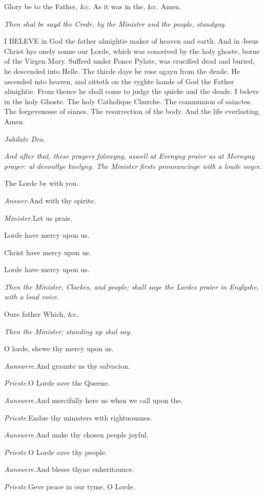 Glory be to the Father, \&c. As it was in the, \&c.
Amen.

\emph{Then
shal be sayd the Crede, by the Minister and the people, standyng.}

I
BELEVE in God the father almightie maker of heaven and earth. And in Jesus
Christ hys onely sonne our Lorde, which was conceived by the holy ghoste,
borne of the Virgen Mary. Suffred under Ponce Pylate, was crucified dead
and buried, he descended into Helle. The thirde daye he rose agayn from
the deade. He ascended into heaven, and sitteth on the ryghte hande of
God the Father almightie. From thence he shall come to judge the quicke
and the deade. I beleve in the holy Ghoste. The holy Catholique Churche.
The communion of sainctes. The forgevenesse of sinnes. The resurrection
of the body. And the life everlasting. Amen.

\emph{Jubilate
Deo.}

\emph{And after that, these prayers folowyng, aswell at Evenyng praier as at
Mornyng prayer: al devoutlye knelyng. The Minister firste pronouncinge
with a loude voyce.}

The Lorde be with you.

\emph{Answer.}And with thy
spirite.

\emph{Minister.}Let us praie.

Lorde have mercy upon us.

Christ have mercy upon us.

Lorde have mercy upon us.

\emph{Then
the Minister, Clarkes, and people; shall saye the Lordes praier in Englyshe,
with a loud voice.}

Oure
father Which, \&c.

\emph{Then
the Minister; standing up shal say.}

O lorde, shewe thy mercy upon us.

\emph{Aunswere.}And graunte
us thy salvacion.

\emph{Prieste.}\emph{}O Lorde
save the Queene.

\emph{Aunswere.}And mercifully
here us when we call upon the.

\emph{Prieste.}Endue thy ministers
with rightuousnes.

\emph{Aunswere.}And make thy
chosen people joyful.

\emph{Prieste.}O Lorde save
thy people.

\emph{Aunswere.}And blesse
thyne enheritaunce.

\emph{Prieste.}Geve peace in
our tyme, O Lorde.

